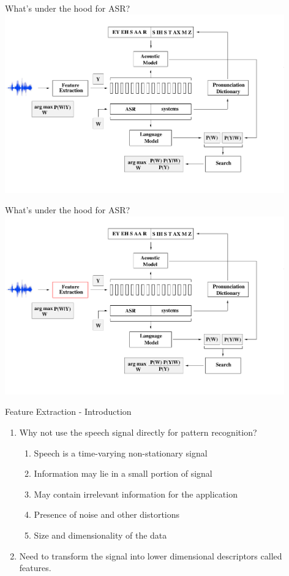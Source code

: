 \begin{frame}{What's under the hood for ASR?}
\includegraphics[height=77mm]{figures/ASR9}
\end{frame}

\begin{frame}{What's under the hood for ASR?}
\includegraphics[height=77mm]{figures/b1}
\end{frame}

\begin{frame}{Feature Extraction - Introduction}
\begin{enumerate}
\item Why not use the speech signal directly for pattern recognition?
\begin{enumerate}
\item Speech is a \alert{time-varying non-stationary signal}
\item Information may lie in a \alert{small portion} of signal
\item May contain \alert{irrelevant information} for the application
\item Presence of \alert{noise and other distortions}
\item \alert{Size and dimensionality} of the data
\end{enumerate}
\item Need to transform the signal into lower dimensional descriptors called \alert{features}.
\end{enumerate}
\end{frame}

